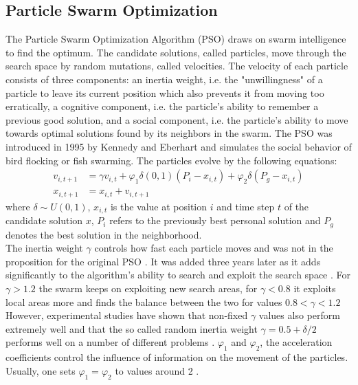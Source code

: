\subsection{Particle Swarm Optimization}
The Particle Swarm Optimization Algorithm (PSO) draws on swarm intelligence to find the optimum. The candidate solutions, called particles, move through the search space by random mutations, called velocities. The velocity of each particle consists of three components: an inertia weight, i.e. the "unwillingness" of a particle to leave its current position which also prevents it from moving too erratically, a cognitive component, i.e. the particle's ability to remember a previous good solution, and a social component, i.e. the particle's ability to move towards optimal solutions found by its neighbors in the swarm. 
The PSO was introduced in 1995 by Kennedy and Eberhart and simulates the social behavior of bird flocking or fish swarming. 
The particles evolve by the following equations:
\begin{align}
v_{i,t+1} &= \gamma v_{i,t} + \varphi_1 \delta(0,1)(P_i - x_{i,t}) + \varphi_2 \delta(P_g - x_{i,t})\\
x_{i,t+1} &= x_{i,t} + v_{i,t+1}
\end{align}
where $\delta \sim U(0,1)$, $x_{i,t}$ is the value at position $i$ and time step $t$ of the candidate solution $x$, $P_i$ refers to the previously best personal solution and $P_g$ denotes the best solution in the neighborhood. \\
The inertia weight $\gamma$ controls how fast each particle moves and was not in the proposition for the original PSO \citep{kennedy1995}. It was added three years later as it adds significantly to the algorithm's ability to search and exploit the search space \cite[p. 70]{shi1998modified}. For $\gamma > 1.2$ the swarm keeps on exploiting new search areas, for $\gamma < 0.8$ it exploits local areas more and finds the balance between the two for values $0.8 < \gamma < 1.2$ However, experimental studies have shown that non-fixed $\gamma$ values also perform extremely well and that the so called random inertia weight $\gamma = 0.5 + \delta/2$ performs well on a number of different problems \cite[p. 643]{bansal2011inertia}.
$\varphi_1$ and $\varphi_2$, the acceleration coefficients control the influence of information on the movement of the particles. Usually, one sets $\varphi_1 = \varphi_2$ to values around 2 \cite[p. 1946]{kennedy1995}. \\
